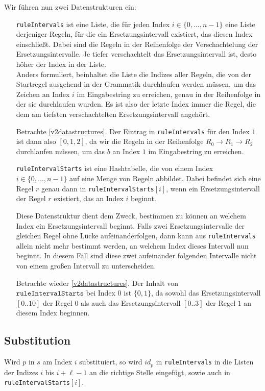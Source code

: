 Wir führen nun zwei Datenstrukturen ein: 
\begin{itemize}[leftmargin=10em]
	\item[\texttt{ruleIntervals}] ist eine Liste, die für jeden Index $i \in \{0, \dots, n - 1\}$ eine Liste derjeniger Regeln, für die ein Ersetzungsintervall existiert, das diesen Index einschließt. Dabei sind die Regeln in der Reihenfolge der Verschachtelung der Ersetzungsintervalle. Je tiefer verschachtelt das Ersetzungsintervall ist, desto höher der Index in der Liste.\\ 
	Anders formuliert, beinhaltet die Liste die Indizes aller Regeln, die von der Startregel ausgehend in der Grammatik durchlaufen werden müssen, um das Zeichen an Index $i$ im Eingabestring zu erreichen, genau in der Reihenfolge in der sie durchlaufen wurden. Es ist also der letzte Index immer die Regel, die dem am tiefsten verschachtelten Ersetzungsintervall angehört. 
	
	Betrachte \autoref{v2datastructures}. Der Eintrag in \texttt{ruleIntervals} für den Index $1$ ist dann also $[0, 1, 2]$, da wir die Regeln in der Reihenfolge $R_0 \rightarrow R_1 \rightarrow R_2$ durchlaufen müssen, um das $b$ an Index $1$ im Eingabestring zu erreichen.
	
	\item[\texttt{ruleIntervalStarts}] ist eine Hashtabelle, die von einem Index $i \in \{0, \dots, n - 1\}$ auf eine Menge von Regeln abbildet. Dabei befindet sich eine Regel $r$ genau dann in \texttt{ruleIntervalStarts}$[i]$, wenn ein Ersetzungsintervall der Regel $r$ existiert, das an Index $i$ beginnt.
	
	Diese Datenstruktur dient dem Zweck, bestimmen zu können an welchem Index ein Ersetzungsintervall beginnt. Falls zwei Ersetzungsintervalle der gleichen Regel ohne Lücke aufeinanderfolgen, dann kann aus \texttt{ruleIntervals} allein nicht mehr bestimmt werden, an welchem Index dieses Intervall nun beginnt. In diesem Fall sind diese zwei aufeinander folgenden Intervalle nicht von einem großen Intervall zu unterscheiden.

    Betrachte wieder \autoref{v2datastructures}. Der Inhalt von\\
    $\texttt{ruleIntervalStarts}$ bei Index $0$ ist $\{0, 1\}$, da sowohl das Ersetzungsintervall $[0..10]$ der Regel $0$ als auch das Ersetzungsintervall $[0..3]$ der Regel $1$ an diesem Index beginnen. 
\end{itemize}



\subsection{Substitution}
Wird $p$ in $s$ am Index $i$ substituiert, so wird $id_p$ in \texttt{ruleIntervals} in die Listen der Indizes $i$ bis $i + \ell - 1$ an die richtige Stelle eingefügt, sowie auch in \texttt{ruleIntervalStarts}$[i]$.

